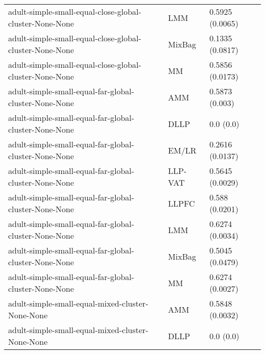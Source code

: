 \begin{longtable}{lll}
                                                      adult-simple-small-equal-close-global-cluster-None-None &       LMM &                           0.5925 (0.0065) \\
                                                      adult-simple-small-equal-close-global-cluster-None-None &    MixBag &                           0.1335 (0.0817) \\
                                                      adult-simple-small-equal-close-global-cluster-None-None &        MM &                           0.5856 (0.0173) \\
                                                        adult-simple-small-equal-far-global-cluster-None-None &       AMM &                            0.5873 (0.003) \\
                                                        adult-simple-small-equal-far-global-cluster-None-None &      DLLP &                                 0.0 (0.0) \\
                                                        adult-simple-small-equal-far-global-cluster-None-None &     EM/LR &                           0.2616 (0.0137) \\
                                                        adult-simple-small-equal-far-global-cluster-None-None &   LLP-VAT &                           0.5645 (0.0029) \\
                                                        adult-simple-small-equal-far-global-cluster-None-None &     LLPFC &                            0.588 (0.0201) \\
                                                        adult-simple-small-equal-far-global-cluster-None-None &       LMM &                           0.6274 (0.0034) \\
                                                        adult-simple-small-equal-far-global-cluster-None-None &    MixBag &                           0.5045 (0.0479) \\
                                                        adult-simple-small-equal-far-global-cluster-None-None &        MM &                           0.6274 (0.0027) \\
                                                             adult-simple-small-equal-mixed-cluster-None-None &       AMM &                           0.5848 (0.0032) \\
                                                             adult-simple-small-equal-mixed-cluster-None-None &      DLLP &                                 0.0 (0.0) \\

\end{longtable}
